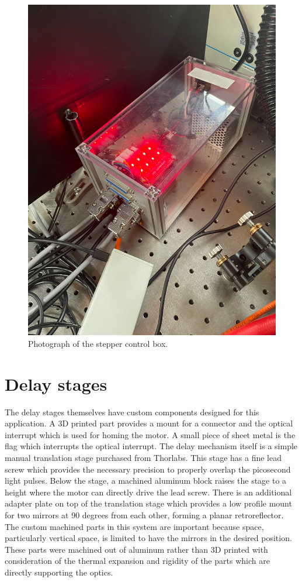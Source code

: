 \begin{figure}
	\includegraphics[width=5in]{opa400/images/opa400_control_box}
\caption[Stepper Control Box]{
Photograph of the stepper control box.
}
\label{opa4:fig:control_box_photo}
\end{figure}

\clearpage
\section{Delay stages}  %

The delay stages themselves have custom components designed for this application.
A 3D printed part provides a mount for a connector and the optical interrupt which is used for homing the motor.
A small piece of sheet metal is the flag which interrupts the optical interrupt.
The delay mechanism itself is a simple manual translation stage purchased from Thorlabs\cite{thorlabs_pt1b}.
This stage has a fine lead screw which provides the necessary precision to properly overlap the picosecond light pulses.
Below the stage, a machined aluminum block raises the stage to a height where the motor can directly drive the lead screw.
There is an additional adapter plate on top of the translation stage which provides a low profile mount for two mirrors at 90 degrees from each other, forming a planar retroreflector.
The custom machined parts in this system are important because space, particularly vertical space, is limited to have the mirrors in the desired position.
These parts were machined out of aluminum rather than 3D printed with consideration of the thermal expansion and rigidity of the parts which are directly supporting the optics.

